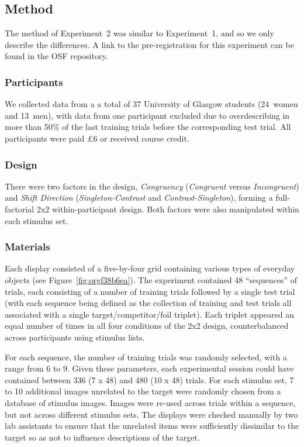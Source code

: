 \documentclass[natbib,man,a4paper]{apa6}
\begin{document}
\subsection*{Method}
\label{sec:org7579b6d}

The method of Experiment~2 was similar to Experiment~1, and so we only describe the differences. A link to the pre-registration for this experiment can be found in the OSF repository.

\subsubsection*{Participants}
\label{sec:org44d7cf7}

We collected data from a a total of 37 University of Glasgow students (24~women and 13~men), with data from one participant excluded due to overdescribing in more than 50\% of the last training trials before the corresponding test trial. All participants were paid £6 or received course credit.

\subsubsection*{Design}
\label{sec:org24a78a5}

There were two factors in the design, \emph{Congruency} (\emph{Congruent} versus \emph{Incongruent}) and \emph{Shift Direction} (\emph{Singleton-Contrast} and \emph{Contrast-Singleton}), forming a full-factorial 2x2 within-participant design.  Both factors were also manipulated within each stimulus set.

\subsubsection*{Materials}
\label{sec:orgcb0d8ce}

Each display consisted of a five-by-four grid containing various types of everyday objects (see Figure~\ref{fig:orgf38b6ea}). The experiment contained 48 ``sequences'' of trials, each consisting of a number of training trials followed by a single test trial (with each sequence being defined as the collection of training and test trials all associated with a single target/competitor/foil triplet). Each triplet appeared an equal number of times in all four conditions of the 2x2 design, counterbalanced across participants using stimulus lists.

For each sequence, the number of training trials was randomly selected, with a range from 6 to 9. Given these parameters, each experimental session could have contained between 336 (7 x 48) and 480 (10 x 48) trials. For each stimulus set, 7 to 10 additional images unrelated to the target were randomly chosen from a database of stimulus images. Images were re-used across trials within a sequence, but not across different stimulus sets. The displays were checked manually by two lab assistants to ensure that the unrelated items were sufficiently dissimilar to the target so as not to influence descriptions of the target.
\end{document}
